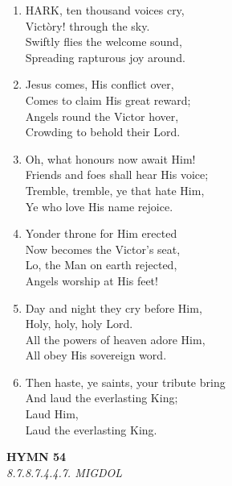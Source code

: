 \documentclass[11pt,a4paper]{article}
\begin{document}
\begin{enumerate}
    \item HARK, ten thousand voices cry, \\
        Vict\`ory! through the sky. \\
        Swiftly flies the welcome sound, \\
        Spreading rapturous joy around.

    \item Jesus comes, His conflict over, \\
        Comes to claim His great reward; \\
        Angels round the Victor hover, \\
        Crowding to behold their Lord.

    \item Oh, what honours now await Him! \\
        Friends and foes shall hear His voice; \\
        Tremble, tremble, ye that hate Him, \\
        Ye who love His name rejoice.

    \item Yonder throne for Him erected \\
        Now becomes the Victor's seat, \\
        Lo, the Man on earth rejected, \\
        Angels worship at His feet!

    \item Day and night they cry before Him, \\
        Holy, holy, holy Lord. \\
        All the powers of heaven adore Him, \\
        All obey His sovereign word.

    \item Then haste, ye saints, your tribute bring \\
        And laud the everlasting King; \\
        Laud Him, \\
        Laud the everlasting King.

\end{enumerate}

\newpage
\begin{center}
    {\Large \textbf{HYMN 54}}
    \\
    \textit{8.7.8.7.4.4.7. MIGDOL}
\end{center}
\vspace{1em}
\end{document}
